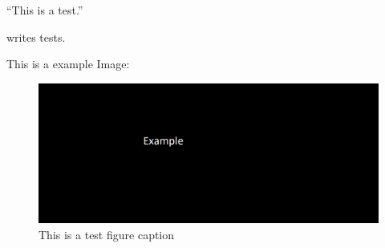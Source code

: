 
\enquote{This is a test.} \parencite{test}

\textcite{test} writes tests.

\lipsum[1-2]

This is a example Image:

\begin{figure}
    \centering
    \includegraphics[width=0.7 \linewidth]{images/Example.png}
    \caption{This is a test figure caption}
\end{figure}